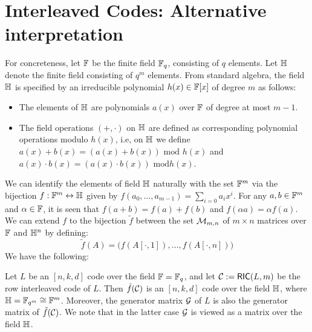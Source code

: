 \appendix
\section{Interleaved Codes: Alternative interpretation} \label{app:AltILC}
For concreteness, let $\mathbb{F}$ be the finite field $\mathbb{F}_q$, consisting of $q$
elements. Let $\mathbb{H}$ denote the finite field consisting of $q^m$ elements. From
standard algebra, the field $\mathbb{H}$ is specified by an irreducible polynomial $h(x)\in \mathbb{F}[x]$ of
degree $m$ as follows:
\begin{itemize}
\item The elements of $\mathbb{H}$ are polynomials $a(x)$ over $\mathbb{F}$ of degree at most
$m-1$.
\item The field operations $(+,\cdot)$ on $\mathbb{H}$ are defined as corresponding
polynomial operations modulo $h(x)$, i.e, on $\mathbb{H}$ we define $a(x)+b(x) =
(a(x)+b(x)) \text{ mod } h(x)$ and $a(x)\cdot b(x) = (a(x)\cdot b(x)) \text{ mod
} h(x)$. 
\end{itemize}
We can identify the elements of field $\mathbb{H}$ naturally with the set $\mathbb{F}^m$ via
the bijection $f:\mathbb{F}^m\leftrightarrow \mathbb{H}$ given by
$f(a_0,\ldots,a_{m-1})=\sum_{i=0}a_ix^i$. For any $a,b\in \mathbb{F}^m$ and $\alpha\in
\mathbb{F}$, it is seen that $f(a+b)=f(a)+f(b)$ and $f(\alpha a)=\alpha f(a)$. We can
extend $f$ to the bijection $\tilde{f}$ between the set $\mathcal{M}_{m,n}$ of $m\times n$
matrices over $\mathbb{F}$ and $\mathbb{H}^n$ by defining:
\begin{equation}\label{lem:bijection}
\tilde{f}(A) = \big(f(A[\cdot,1]),\ldots,f(A[\cdot,n])\big)
\end{equation}
We have the following:
\begin{lemma}\label{lem:correspondence}
Let $L$ be an $[n,k,d]$ code over the field $\mathbb{F}=\mathbb{F}_q$, and let $\mathcal{C} :=
\mathsf{RIC}(L,m)$ be the row interleaved code of $L$. Then $\tilde{f}(\mathcal{C})$ is an
$[n,k,d]$ code over the field $\mathbb{H}$, where $\mathbb{H}=\mathbb{F}_{q^m}\cong \mathbb{F}^m$. Moreover,
the generator matrix $\mathcal{G}$ of $L$ is also the generator matrix of
$\tilde{f}(\mathcal{C})$. We note that in the latter case $\mathcal{G}$ is viewed as a
matrix over the field $\mathbb{H}$.
\end{lemma}
